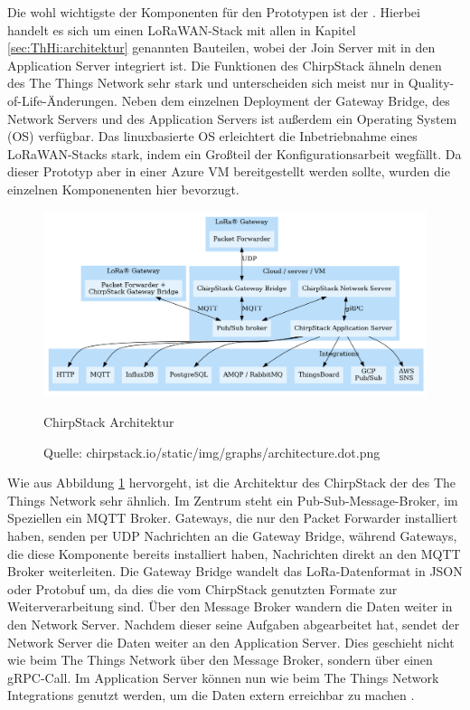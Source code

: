Die wohl wichtigste der Komponenten für den Prototypen ist der . Hierbei handelt es sich um einen LoRaWAN-Stack mit allen in Kapitel \ref{sec:ThHi:architektur} genannten Bauteilen, wobei der Join Server mit in den Application Server integriert ist. Die Funktionen des ChirpStack ähneln denen des The Things Network sehr stark und unterscheiden sich meist nur in Quality-of-Life-Änderungen. Neben dem einzelnen Deployment der Gateway Bridge, des Network Servers und des Application Servers ist außerdem ein Operating System (OS) verfügbar. Das linuxbasierte OS erleichtert die Inbetriebnahme eines LoRaWAN-Stacks stark, indem ein Großteil der Konfigurationsarbeit wegfällt. Da dieser Prototyp aber in einer Azure VM bereitgestellt werden sollte, wurden die einzelnen Komponenenten hier bevorzugt.

\begin{figure}[H]
  \vspace{10pt}
  \begin{center}
    \includegraphics[width=1\textwidth]{./images/chirpstack_architecture.png}
  \end{center}
  \vspace{-5pt}
  \caption[ChirpStack Architektur]{ChirpStack Architektur}
  \caption*{Quelle: {chirpstack.io/static/img/graphs/architecture.dot.png}}
  \label{fig:chirpstack_architecture}
  \vspace{-10pt}
\end{figure}

Wie aus Abbildung \ref{fig:chirpstack_architecture} hervorgeht, ist die Architektur des ChirpStack der des The Things Network sehr ähnlich. Im Zentrum steht ein Pub-Sub-Message-Broker, im Speziellen ein MQTT Broker. Gateways, die nur den Packet Forwarder installiert haben, senden per UDP Nachrichten an die Gateway Bridge, während Gateways, die diese Komponente bereits installiert haben, Nachrichten direkt an den MQTT Broker weiterleiten. Die Gateway Bridge wandelt das LoRa-Datenformat in JSON oder Protobuf um, da dies die vom ChirpStack genutzten Formate zur Weiterverarbeitung sind. Über den Message Broker wandern die Daten weiter in den Network Server. Nachdem dieser seine Aufgaben abgearbeitet hat, sendet der Network Server die Daten weiter an den Application Server. Dies geschieht nicht wie beim The Things Network über den Message Broker, sondern über einen gRPC-Call. Im Application Server können nun wie beim The Things Network Integrations genutzt werden, um die Daten extern erreichbar zu machen .

